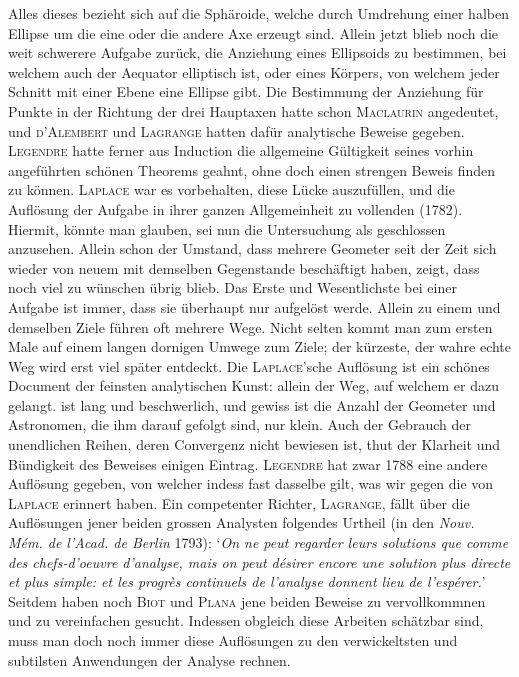 Alles dieses bezieht sich auf die Sphäroide, welche durch Umdrehung einer halben Ellipse um die eine oder die andere Axe erzeugt sind. Allein jetzt blieb noch die weit schwerere Aufgabe zurück, die Anziehung eines Ellipsoids zu bestimmen, bei welchem auch der Aequator elliptisch ist, oder eines Körpers, von welchem jeder Schnitt mit einer Ebene eine Ellipse gibt. Die Bestimmung der Anziehung für Punkte in der Richtung der drei Hauptaxen hatte schon \textsc{Maclaurin} angedeutet, und \textsc{d'Alembert} und \textsc{Lagrange} hatten dafür analytische Beweise gegeben. \textsc{Legendre} hatte ferner aus Induction die allgemeine Gültigkeit seines vorhin angeführten schönen Theorems geahnt, ohne doch einen strengen Beweis finden zu können. \textsc{Laplace} war es vorbehalten, diese Lücke auszufüllen, und die Auflösung der Aufgabe in ihrer ganzen Allgemeinheit zu vollenden (1782). Hiermit, könnte man glauben, sei nun die Untersuchung als geschlossen anzusehen. Allein schon der Umstand, dass mehrere Geometer seit der Zeit sich wieder von neuem mit demselben Gegenstande beschäftigt haben, zeigt, dass noch viel zu wünschen übrig blieb. Das Erste und Wesentlichste bei einer Aufgabe ist immer, dass sie überhaupt nur aufgelöst werde. Allein zu einem und demselben Ziele führen oft mehrere Wege. Nicht selten kommt man zum ersten Male auf einem langen dornigen Umwege zum Ziele; der kürzeste, der wahre echte Weg wird erst viel später entdeckt. Die \textsc{Laplace}'sche Auflösung ist ein schönes Document der feinsten analytischen Kunst: allein der Weg, auf welchem er dazu gelangt. ist lang und beschwerlich, und gewiss ist die Anzahl der Geometer und
Astronomen, die ihm darauf gefolgt sind, nur klein. Auch der Gebrauch der unendlichen Reihen, deren Convergenz nicht bewiesen ist, thut der Klarheit und Bündigkeit des Beweises einigen Eintrag. \textsc{Legendre} hat zwar 1788 eine andere Auflösung gegeben, von welcher indess fast dasselbe gilt, was wir gegen die von \textsc{Laplace} erinnert haben. Ein competenter Richter, \textsc{Lagrange}, fällt über die Auflösungen jener beiden grossen Analysten folgendes Urtheil (in den \textit{Nouv. Mém. de l'Acad. de Berlin} 1793): ‘\textit{On ne peut regarder leurs solutions que comme des chefs-d'oeuvre d'analyse, mais on peut désirer encore une solution plus directe et plus simple: et les progrès continuels de l'analyse donnent lieu de l'espérer.}’ Seitdem haben noch \textsc{Biot} und \textsc{Plana} jene beiden Beweise zu vervollkommnen und zu vereinfachen gesucht. Indessen obgleich diese Arbeiten schätzbar sind, muss man doch noch immer diese Auflösungen zu den verwickeltsten und subtilsten Anwendungen der Analyse rechnen.

